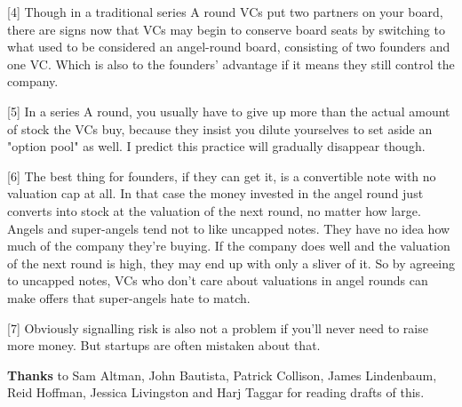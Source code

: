 [4] Though in a traditional series A round VCs put two
                    partners on your board, there are signs now that VCs may
                    begin to conserve board seats by switching to what used to
                    be considered an angel-round board, consisting of two
                    founders and one VC. Which is also to the founders'
                    advantage if it means they still control the company.

[5] In a series A round, you usually have to give up more
                    than the actual amount of stock the VCs buy, because they
                    insist you dilute yourselves to set aside an "option pool"
                    as well. I predict this practice will gradually disappear
                    though.

[6] The best thing for founders, if they can get it, is a
                    convertible note with no valuation cap at all. In that case
                    the money invested in the angel round just converts into
                    stock at the valuation of the next round, no matter how
                    large. Angels and super-angels tend not to like uncapped
                    notes. They have no idea how much of the company they're
                    buying. If the company does well and the valuation of the
                    next round is high, they may end up with only a sliver of
                    it. So by agreeing to uncapped notes, VCs who don't care
                    about valuations in angel rounds can make offers that
                    super-angels hate to match.

[7] Obviously signalling risk is also not a problem if you'll
                    never need to raise more money. But startups are often
                    mistaken about that.

\textbf{Thanks} to Sam Altman,
                    John Bautista, Patrick Collison, James Lindenbaum, Reid
                    Hoffman, Jessica Livingston and Harj Taggar for reading
                    drafts of this.



              
            
          
            
              
                


                  
              
            
          
